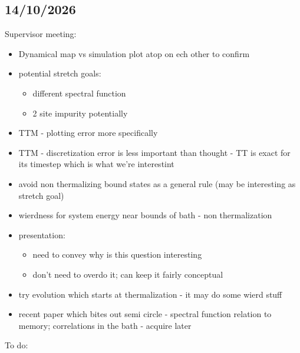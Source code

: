 \documentclass[
  letterpaper,
  DIV=11,
  numbers=noendperiod,
  oneside]{scrartcl}
\author{}
\date{}
\providecommand{\tightlist}{%
  \setlength{\itemsep}{0pt}\setlength{\parskip}{0pt}}
\begin{document}
\subsection{14/10/2026}\label{section}

Supervisor meeting:

\begin{itemize}
\item
  Dynamical map vs simulation plot atop on ech other to confirm
\item
  potential stretch goals:

  \begin{itemize}
  \tightlist
  \item
    different spectral function
  \item
    2 site impurity potentially
  \end{itemize}
\item
  TTM - plotting error more specifically
\item
  TTM - discretization error is less important than thought - TT is
  exact for its timestep which is what we're interestint
\item
  avoid non thermalizing bound states as a general rule (may be
  interesting as stretch goal)
\item
  wierdness for system energy near bounds of bath - non thermalization
\item
  presentation:

  \begin{itemize}
  \tightlist
  \item
    need to convey why is this question interesting
  \item
    don't need to overdo it; can keep it fairly conceptual
  \end{itemize}
\item
  try evolution which starts at thermalization - it may do some wierd
  stuff
\item
  recent paper which bites out semi circle - spectral function relation
  to memory; correlations in the bath - acquire later
\end{itemize}

To do:
\end{document}
